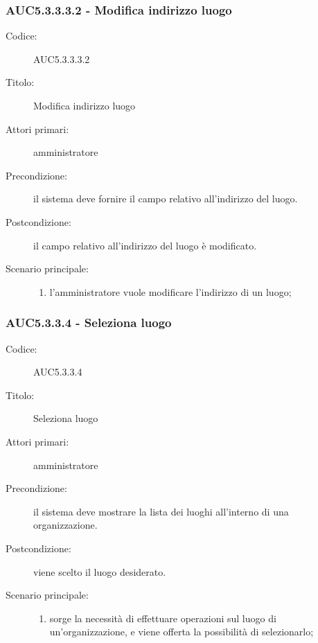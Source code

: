 \documentclass[../../../analisi-dei-requisiti.tex]{subfiles}
\begin{document}
\subsubsection{AUC5.3.3.3.2 - Modifica indirizzo luogo}%
\label{subsub:AUC5.3.3.3.2}
\begin{description}
  \item[Codice:] AUC5.3.3.3.2
  \item[Titolo:] Modifica indirizzo luogo
  \item[Attori primari:] amministratore
  \item[Precondizione:] il sistema deve fornire il campo relativo all'indirizzo del luogo.
  \item[Postcondizione:] il campo relativo all'indirizzo del luogo è modificato.
  \item[Scenario principale:]
  \begin{enumerate}
    \item l'amministratore vuole modificare l'indirizzo di un luogo;
  \end{enumerate}
\end{description}

\subsubsection{AUC5.3.3.4 - Seleziona luogo}%
\label{subsub:AUC5.3.3.4}
\begin{description}
  \item[Codice:] AUC5.3.3.4
  \item[Titolo:] Seleziona luogo
  \item[Attori primari:] amministratore
  \item[Precondizione:] il sistema deve mostrare la lista dei luoghi all'interno di una organizzazione.
  \item[Postcondizione:] viene scelto il luogo desiderato.
  \item[Scenario principale:]
  \begin{enumerate}
    \item sorge la necessità di effettuare operazioni sul luogo di un'organizzazione, e viene offerta la possibilità di selezionarlo;
  \end{enumerate}
\end{description}
\end{document}
